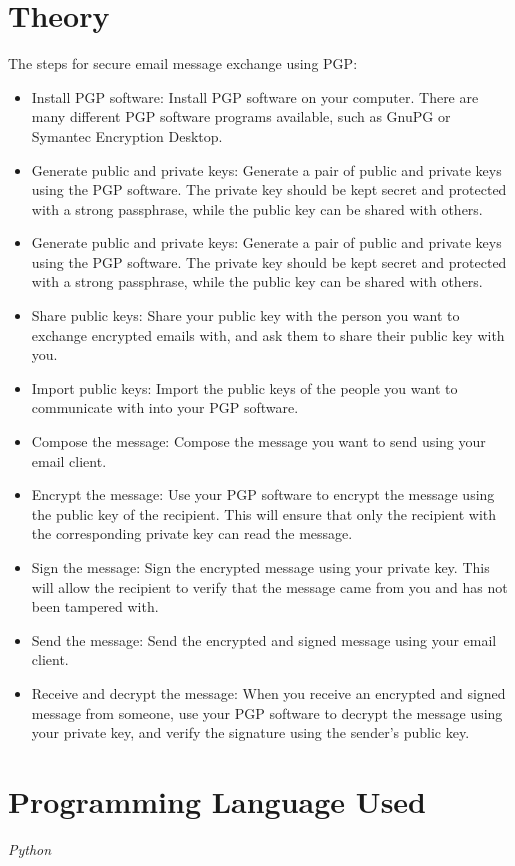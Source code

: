 \documentclass{article}
\begin{document}
\section{\textbf{Theory}}
The steps for secure email message exchange using PGP:
\begin{itemize}
    \item Install PGP software: Install PGP software on your computer. There are many different PGP software programs available, such as GnuPG or Symantec Encryption Desktop.
    \item Generate public and private keys: Generate a pair of public and private keys using the PGP software. The private key should be kept secret and protected with a strong passphrase, while the public key can be shared with others.
    \item Generate public and private keys: Generate a pair of public and private keys using the PGP software. The private key should be kept secret and protected with a strong passphrase, while the public key can be shared with others.
    \item Share public keys: Share your public key with the person you want to exchange encrypted emails with, and ask them to share their public key with you.
    \item Import public keys: Import the public keys of the people you want to communicate with into your PGP software.
    \item Compose the message: Compose the message you want to send using your email client.
    \item Encrypt the message: Use your PGP software to encrypt the message using the public key of the recipient. This will ensure that only the recipient with the corresponding private key can read the message.
    \item Sign the message: Sign the encrypted message using your private key. This will allow the recipient to verify that the message came from you and has not been tampered with.
    \item Send the message: Send the encrypted and signed message using your email client.
    \item Receive and decrypt the message: When you receive an encrypted and signed message from someone, use your PGP software to decrypt the message using your private key, and verify the signature using the sender's public key.
\end{itemize}
\section{\textbf{Programming Language Used}}
\textit{Python}
\end{document}

